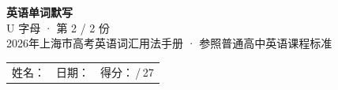 \documentclass[10pt,a4paper]{article}
\begin{document}
\pagestyle{plain}

\begin{center}
{\LARGE\bfseries 英语单词默写}\\[0.22em]
{\large U 字母 · 第 2 / 2 份}\\[0.18em]
{\small 2026年上海市高考英语词汇用法手册 · 参照普通高中英语课程标准}
\end{center}

\vspace{0.25em}
\noindent\begin{tabular}{@{}p{}@{}p{}@{}p{}@{}}
姓名：\underline{\hspace{2.0cm}} & 日期：\underline{\hspace{2.0cm}} & 得分：\underline{\hspace{1.3cm}}\,/\,27 \\
\end{tabular}

\vspace{0.3em}

\vspace{0.08em}
\end{document}
